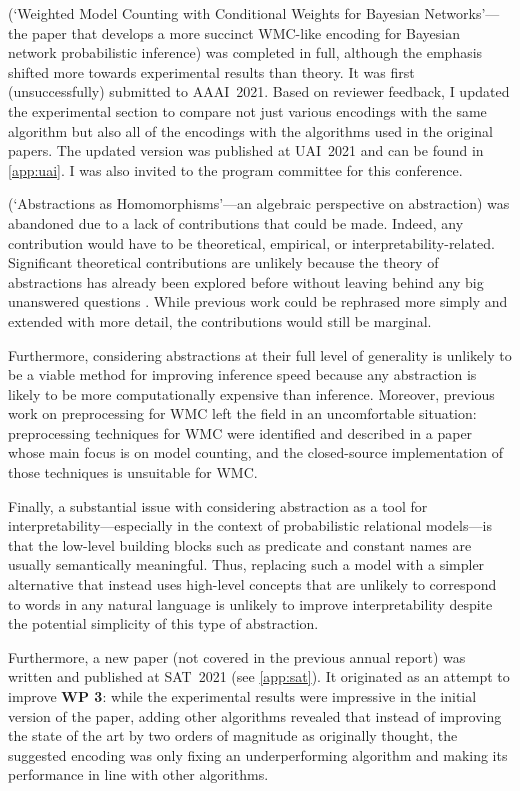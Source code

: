 \documentclass{article}
\begin{document}
{\begin{description}
\begin{itemize}
  \end{itemize}
\item[WP 3] (`Weighted Model Counting with Conditional Weights for Bayesian
  Networks'---the paper that develops a more succinct WMC-like encoding for
  Bayesian network probabilistic inference) was completed in full, although the
  emphasis shifted more towards experimental results than theory. It was first
  (unsuccessfully) submitted to AAAI~2021. Based on reviewer feedback, I updated
  the experimental section to compare not just various encodings with the same
  algorithm but also all of the encodings with the algorithms used in the
  original papers. The updated version was published at UAI~2021 and can be
  found in \cref{app:uai}. I was also invited to the program committee for this
  conference.
  \item[WP 4] (`Abstractions as Homomorphisms'---an algebraic perspective on
  abstraction) was abandoned due to a lack of contributions that could be made.
  Indeed, any contribution would have to be theoretical, empirical, or
  interpretability-related. Significant theoretical contributions are unlikely
  because the theory of abstractions has already been explored before without
  leaving behind any big unanswered questions \cite{DBLP:journals/kbs/Belle20}.
  While previous work could be rephrased more simply and extended with more
  detail, the contributions would still be marginal.

  Furthermore, considering abstractions at their full level of generality is
  unlikely to be a viable method for improving inference speed because any
  abstraction is likely to be more computationally expensive than inference.
  Moreover, previous work on preprocessing for WMC left the field in an
  uncomfortable situation: preprocessing techniques for WMC were identified and
  described in a paper \cite{DBLP:conf/aaai/LagniezM14} whose main focus is on
  model counting, and the closed-source implementation of those techniques is
  unsuitable for WMC.

  Finally, a substantial issue with considering abstraction as a tool for
  interpretability---especially in the context of probabilistic relational
  models---is that the low-level building blocks such as predicate and constant
  names are usually semantically meaningful. Thus, replacing such a model with a
  simpler alternative that instead uses high-level concepts that are unlikely to
  correspond to words in any natural language is unlikely to improve
  interpretability despite the potential simplicity of this type of abstraction.
\item
  Furthermore, a new paper (not covered in the previous annual report) was
  written and published at SAT~2021 (see \cref{app:sat}). It originated as an
  attempt to improve \textbf{WP 3}: while the experimental results were
  impressive in the initial version of the paper, adding other algorithms
  revealed that instead of improving the state of the art by two orders of
  magnitude as originally thought, the suggested encoding was only fixing an
  underperforming algorithm and making its performance in line with other
  algorithms.


\end{description}}
\end{document}
